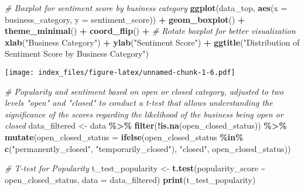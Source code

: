\documentclass[
]{article}
\newenvironment{Shaded}{\begin{snugshade}}{\end{snugshade}}
\newcommand{\AttributeTok}[1]{\textcolor[rgb]{0.13,0.29,0.53}{#1}}
\newcommand{\CommentTok}[1]{\textcolor[rgb]{0.56,0.35,0.01}{\textit{#1}}}
\newcommand{\FunctionTok}[1]{\textcolor[rgb]{0.13,0.29,0.53}{\textbf{#1}}}
\newcommand{\NormalTok}[1]{#1}
\newcommand{\OtherTok}[1]{\textcolor[rgb]{0.56,0.35,0.01}{#1}}
\newcommand{\SpecialCharTok}[1]{\textcolor[rgb]{0.81,0.36,0.00}{\textbf{#1}}}
\newcommand{\StringTok}[1]{\textcolor[rgb]{0.31,0.60,0.02}{#1}}
\begin{document}
\begin{Shaded}
\begin{Highlighting}[]
\CommentTok{\# Boxplot for sentiment score by business category}
\FunctionTok{ggplot}\NormalTok{(data\_top, }\FunctionTok{aes}\NormalTok{(}\AttributeTok{x =}\NormalTok{ business\_category, }\AttributeTok{y =}\NormalTok{ sentiment\_score)) }\SpecialCharTok{+}
  \FunctionTok{geom\_boxplot}\NormalTok{() }\SpecialCharTok{+}
  \FunctionTok{theme\_minimal}\NormalTok{() }\SpecialCharTok{+}
  \FunctionTok{coord\_flip}\NormalTok{() }\SpecialCharTok{+}  \CommentTok{\# Rotate boxplot for better visualization}
  \FunctionTok{xlab}\NormalTok{(}\StringTok{"Business Category"}\NormalTok{) }\SpecialCharTok{+}
  \FunctionTok{ylab}\NormalTok{(}\StringTok{"Sentiment Score"}\NormalTok{) }\SpecialCharTok{+}
  \FunctionTok{ggtitle}\NormalTok{(}\StringTok{"Distribution of Sentiment Score by Business Category"}\NormalTok{)}
\end{Highlighting}
\end{Shaded}

\texttt{[image: index\_files/figure-latex/unnamed-chunk-1-6.pdf]}

\begin{Shaded}
\begin{Highlighting}[]
\CommentTok{\# Popularity and sentiment based on open or closed category, adjusted to two levels "open" and "closed" to conduct a t{-}test that allows understanding the significance of the scores regarding the likelihood of the business being open or closed}
\NormalTok{data\_filtered }\OtherTok{\textless{}{-}}\NormalTok{ data }\SpecialCharTok{\%\textgreater{}\%}
  \FunctionTok{filter}\NormalTok{(}\SpecialCharTok{!}\FunctionTok{is.na}\NormalTok{(open\_closed\_status)) }\SpecialCharTok{\%\textgreater{}\%}
  \FunctionTok{mutate}\NormalTok{(}\AttributeTok{open\_closed\_status =} \FunctionTok{ifelse}\NormalTok{(open\_closed\_status }\SpecialCharTok{\%in\%} \FunctionTok{c}\NormalTok{(}\StringTok{"permanently\_closed"}\NormalTok{, }\StringTok{"temporarily\_closed"}\NormalTok{), }
                                     \StringTok{"closed"}\NormalTok{, }
\NormalTok{                                     open\_closed\_status))}

\CommentTok{\# T{-}test for Popularity}
\NormalTok{t\_test\_popularity }\OtherTok{\textless{}{-}} \FunctionTok{t.test}\NormalTok{(popularity\_score }\SpecialCharTok{\textasciitilde{}}\NormalTok{ open\_closed\_status, }\AttributeTok{data =}\NormalTok{ data\_filtered)}
\FunctionTok{print}\NormalTok{(t\_test\_popularity)}
\end{Highlighting}
\end{Shaded}
\end{document}
